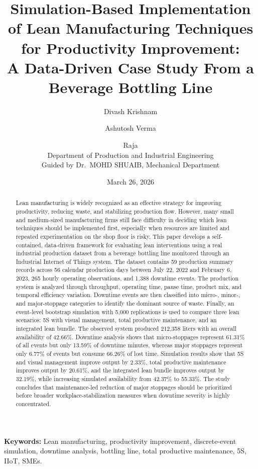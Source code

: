 \documentclass[12pt,a4paper]{article}
\title{\textbf{Simulation-Based Implementation of Lean Manufacturing Techniques for Productivity Improvement:}\\
\textbf{A Data-Driven Case Study From a Beverage Bottling Line}}
\author{
Divash Krishnam \and Ashutosh Verma \and Raja \\
\small Department of Production and Industrial Engineering \\
\small Guided by Dr.\ MOHD SHUAIB, Mechanical Department
}
\date{March 26, 2026}
\begin{document}
\maketitle

\begin{abstract}
Lean manufacturing is widely recognized as an effective strategy for improving productivity, reducing waste, and stabilizing production flow. However, many small and medium-sized manufacturing firms still face difficulty in deciding which lean techniques should be implemented first, especially when resources are limited and repeated experimentation on the shop floor is risky. This paper develops a self-contained, data-driven framework for evaluating lean interventions using a real industrial production dataset from a beverage bottling line monitored through an Industrial Internet of Things system. The dataset contains 59 production summary records across 56 calendar production days between July 22, 2022 and February 6, 2023, 265 hourly operating observations, and 1,388 downtime events. The production system is analyzed through throughput, operating time, pause time, product mix, and temporal efficiency variation. Downtime events are then classified into micro-, minor-, and major-stoppage categories to identify the dominant source of waste. Finally, an event-level bootstrap simulation with 5,000 replications is used to compare three lean scenarios: 5S with visual management, total productive maintenance, and an integrated lean bundle. The observed system produced 212,358 liters with an overall availability of 42.66\%. Downtime analysis shows that micro-stoppages represent 61.31\% of all events but only 13.59\% of downtime minutes, whereas major stoppages represent only 6.77\% of events but consume 66.26\% of lost time. Simulation results show that 5S and visual management improve output by 2.33\%, total productive maintenance improves output by 20.61\%, and the integrated lean bundle improves output by 32.19\%, while increasing simulated availability from 42.37\% to 55.33\%. The study concludes that maintenance-led reduction of major stoppages should be prioritized before broader workplace-stabilization measures when downtime severity is highly concentrated.
\end{abstract}

\textbf{Keywords:} Lean manufacturing, productivity improvement, discrete-event simulation, downtime analysis, bottling line, total productive maintenance, 5S, IIoT, SMEs.
\end{document}

